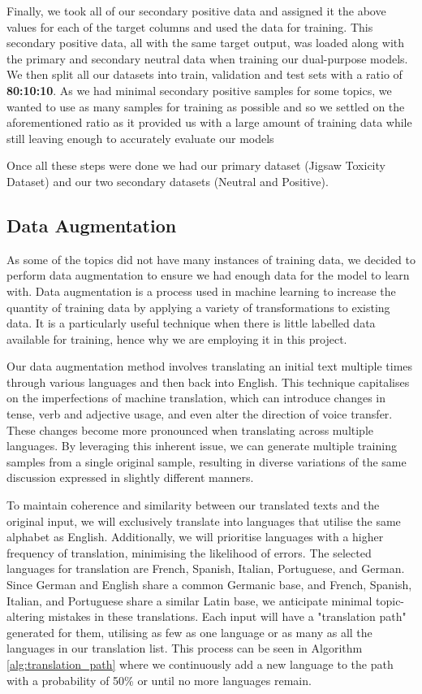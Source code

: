 Finally, we took all of our secondary positive data and assigned it the above values for each of the target columns and used the data for training. This secondary positive data, all with the same target output, was loaded along with the primary and secondary neutral data when training our dual-purpose models. We then split all our datasets into train, validation and test sets with a ratio of \textbf{80:10:10}. As we had minimal secondary positive samples for some topics, we wanted to use as many samples for training as possible and so we settled on the aforementioned ratio as it provided us with a large amount of training data while still leaving enough to accurately evaluate our models

Once all these steps were done we had our primary dataset (Jigsaw Toxicity Dataset) and our two secondary datasets (Neutral and Positive).

\subsection{Data Augmentation}

As some of the topics did not have many instances of training data, we decided to perform data augmentation to ensure we had enough data for the model to learn with. Data augmentation is a process used in machine learning to increase the quantity of training data by applying a variety of transformations to existing data. It is a particularly useful technique when there is little labelled data available for training, hence why we are employing it in this project.

Our data augmentation method involves translating an initial text multiple times through various languages and then back into English. This technique capitalises on the imperfections of machine translation, which can introduce changes in tense, verb and adjective usage, and even alter the direction of voice transfer. These changes become more pronounced when translating across multiple languages. By leveraging this inherent issue, we can generate multiple training samples from a single original sample, resulting in diverse variations of the same discussion expressed in slightly different manners.

To maintain coherence and similarity between our translated texts and the original input, we will exclusively translate into languages that utilise the same alphabet as English. Additionally, we will prioritise languages with a higher frequency of translation, minimising the likelihood of errors. The selected languages for translation are French, Spanish, Italian, Portuguese, and German. Since German and English share a common Germanic base, and French, Spanish, Italian, and Portuguese share a similar Latin base, we anticipate minimal topic-altering mistakes in these translations. Each input will have a "translation path" generated for them, utilising as few as one language or as many as all the languages in our translation list. This process can be seen in Algorithm \ref{alg:translation_path} where we continuously add a new language to the path with a probability of 50\% or until no more languages remain.

